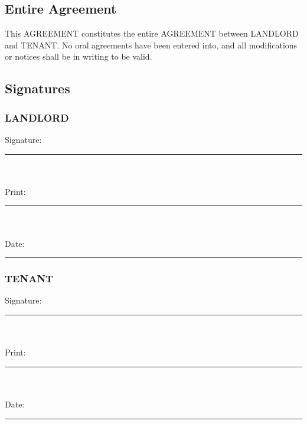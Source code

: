 \documentclass[11pt]{article}
\begin{document}
\subsection{Entire Agreement}
\label{sec:org692bb92}
This AGREEMENT constitutes the entire AGREEMENT between LANDLORD and
TENANT.  No oral agreements have been entered into, and all
modifications or notices shall be in writing to be valid.
\subsection{Signatures}
\label{sec:orgd010bd8}
\subsubsection{LANDLORD}
\label{sec:orgdf070b5}
Signature: \rule{8cm}{0.5pt}
\\  \\
Print: \rule{8cm}{0.5pt}
\\  \\
Date: \rule{8cm}{0.5pt}
\subsubsection{TENANT}
\label{sec:orga8d30ec}
Signature: \rule{8cm}{0.5pt}
\\  \\
Print: \rule{8cm}{0.5pt}
\\  \\
Date: \rule{8cm}{0.5pt}
\end{document}
